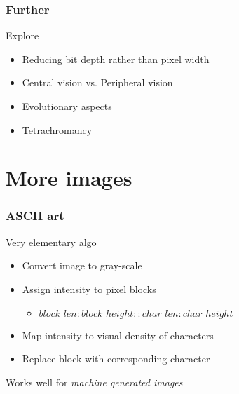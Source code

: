\documentclass[presentation]{beamer}
\begin{document}
\begin{frame}
\frametitle{Further}
\label{sec-2_10}
\begin{block}{Explore}
\label{sec-2_10_1}

\begin{itemize}
\item Reducing bit depth rather than pixel width
\item Central vision vs. Peripheral vision
\item Evolutionary aspects
\item Tetrachromancy
\end{itemize}
\end{block}
\end{frame}
\section*{More images}
\label{sec-3}
\begin{frame}
\frametitle{ASCII art}
\label{sec-3_1}
\begin{block}{Very elementary algo}
\label{sec-3_1_1}

\begin{itemize}
\item Convert image to gray-scale
\item Assign intensity to pixel blocks

\begin{itemize}
\item $block\_len:block\_height::char\_len:char\_height$
\end{itemize}

\item Map intensity to visual density of characters
\item Replace block with corresponding character
\end{itemize}

      Works well for \emph{machine generated images}
\end{block}
\end{frame}
\end{document}
